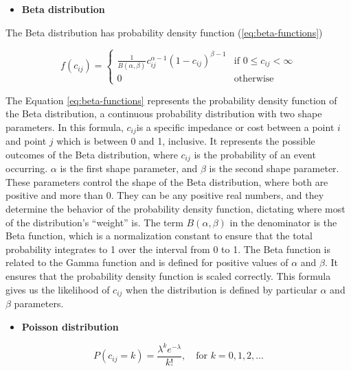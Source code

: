 \documentclass[
11pt, %
oneside, %
english, %
singlespacing, %
]{macthesis} %
\def\tightlist{}
\begin{document}
\begin{itemize}
\tightlist
\item
  \textbf{Beta distribution}
\end{itemize}

The Beta distribution has probability density function (\eqref{eq:beta-functions})

\begin{equation}
f(c_{ij}) = 
\begin{cases}
\frac{1}{B(\alpha, \beta)} c_{ij}^{\alpha - 1}(1 - c_{ij})^{\beta - 1} & \text{if } 0 \leq c_{ij} < \infty \\
0 & \text{otherwise}
\end{cases}
\label{eq:beta-functions}
\end{equation}

The Equation \eqref{eq:beta-functions} represents the probability density function of the Beta distribution, a continuous probability distribution with two shape parameters. In this formula, \(c_{ij}\)is a specific impedance or cost between a point \(i\) and point \(j\) which is between 0 and 1, inclusive. It represents the possible outcomes of the Beta distribution, where \(c_{ij}\) is the probability of an event occurring. \(\alpha\) is the first shape parameter, and \(\beta\) is the second shape parameter. These parameters control the shape of the Beta distribution, where both are positive and more than 0. They can be any positive real numbers, and they determine the behavior of the probability density function, dictating where most of the distribution's ``weight'' is. The term \(B(\alpha, \beta)\) in the denominator is the Beta function, which is a normalization constant to ensure that the total probability integrates to 1 over the interval from 0 to 1. The Beta function is related to the Gamma function and is defined for positive values of \(\alpha\) and \(\beta\). It ensures that the probability density function is scaled correctly. This formula gives us the likelihood of \(c_{ij}\) when the distribution is defined by particular \(\alpha\) and \(\beta\) parameters.

\begin{itemize}
\tightlist
\item
  \textbf{Poisson distribution}
\end{itemize}

\begin{equation}
P(c_{ij} = k) = \frac{\lambda^k e^{-\lambda}}{k!}, \quad \text{for } k = 0, 1, 2, \ldots
\label{eq:poisson-functions}
\end{equation}
\end{document}
